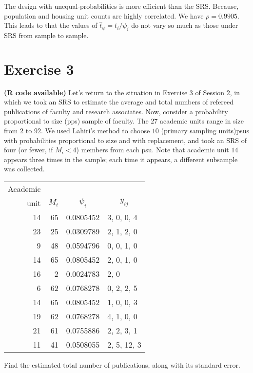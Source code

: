 \documentclass[12pt]{article}
\begin{document}
\begin{enumerate}
{\begin{minipage}[t]{0.97\linewidth}
The design with unequal-probabilities is more efficient than the SRS. Because, population and housing unit counts are highly correlated. We have $\rho=0.9905$. This leads to that the values of $\hat{t}_\psi=t_i/\psi_i$ do not vary so much as those under SRS from sample to sample. 
\end{minipage}}
\end{enumerate}

\section*{Exercise 3}
\textbf{\color{ForestGreen}(R code available)} Let’s return to the situation in Exercise 3 of Session 2, in which we took an SRS to estimate the average and total numbers of refereed publications of faculty and research
associates. Now, consider a probability proportional to size (pps) sample of faculty. The $27$ academic units range in size from $2$ to $92$. We used Lahiri’s method to choose $10$ (primary sampling units)psus with probabilities proportional to size and with replacement, and took an SRS of four (or fewer, if $M_i < 4$) members from each psu. Note that academic unit $14$ appears three times in the sample; each time it appears, a different subsample was collected.
\begin{center}
\begin{tabular}{rrcl}
Academic & &  &  \\
unit & $M_i$ & $\psi_i$ & \multicolumn{1}{c}{$y_{ij}$}  \\
\hline
14 &65& 0.0805452 &3, 0, 0, 4 \\
23& 25 &0.0309789& 2, 1, 2, 0 \\
9& 48& 0.0594796& 0, 0, 1, 0 \\
14 &65& 0.0805452& 2, 0, 1, 0\\
16& 2 &0.0024783 &2, 0\\
6 &62 &0.0768278 &0, 2, 2, 5\\
14& 65& 0.0805452 &1, 0, 0, 3\\
19 &62& 0.0768278& 4, 1, 0, 0\\
21& 61& 0.0755886& 2, 2, 3, 1\\
11& 41& 0.0508055& 2, 5, 12, 3\\
\end{tabular}
\end{center}
Find the estimated total number of publications, along with its standard error. \\
\end{document}
